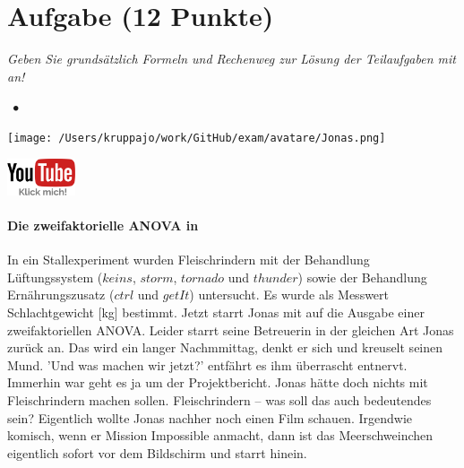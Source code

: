 \documentclass[a4paper, 9pt]{scrartcl}\usepackage[]{graphicx}\usepackage[]{xcolor}
\begin{document}
\clearpage

\section{Aufgabe \hfill (12 Punkte)}

\textit{Geben Sie grundsätzlich Formeln und Rechenweg zur Lösung der Teilaufgaben mit an!} \\[1Ex]
 

 
\ifcollection
\begin{flushright}
\tiny\vspace{-3Ex}
\textbf{\examinhaltstart}
\exammodulestatversuch $\;\bullet$
\exammodulebiostat
\vspace{-4Ex}
\end{flushright}
\begin{minipage}[t]{0.5\textwidth}
\texttt{[image: /Users/kruppajo/work/GitHub/exam/avatare/Jonas.png]}
\end{minipage}
\begin{minipage}[t]{0.5\textwidth}
\hfill
\href{https://youtu.be/i7TadGcyn8c}{\includegraphics[width = 2cm]{img/youtube}}
\end{minipage}
\vspace{-3Ex}
\fi



\ifcollection
\paragraph{Die zweifaktorielle ANOVA in \Rlogo}
\fi

In ein Stallexperiment wurden Fleischrindern mit der Behandlung Lüftungssystem ($keins$, $storm$, $tornado$ und $thunder$) sowie der Behandlung Ernährungszusatz ($ctrl$ und $getIt$) untersucht. Es wurde als Messwert Schlachtgewicht [kg] bestimmt. Jetzt starrt Jonas mit auf die \Rlogo Ausgabe einer zweifaktoriellen ANOVA. Leider starrt seine Betreuerin in der gleichen Art Jonas zurück an. Das wird ein langer Nachmmittag, denkt er sich und kreuselt seinen Mund. 'Und was machen wir jetzt?' entfährt es ihm überrascht entnervt. Immerhin war geht es ja um der Projektbericht. Jonas hätte doch nichts mit Fleischrindern machen sollen. Fleischrindern -- was soll das auch bedeutendes sein? Eigentlich wollte Jonas nachher noch einen Film schauen. Irgendwie komisch, wenn er Mission Impossible anmacht, dann ist das Meerschweinchen eigentlich sofort vor dem Bildschirm und starrt hinein.
\end{document}
